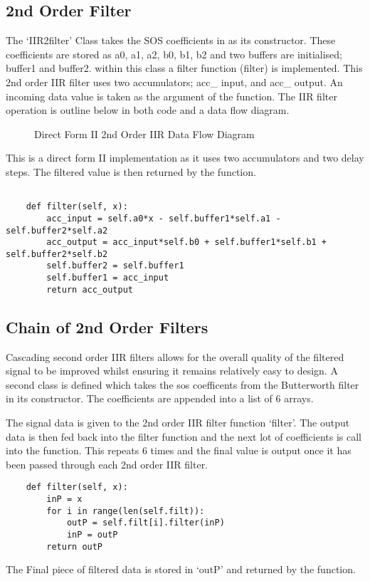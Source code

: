\documentclass{article}
\begin{document}
\subsection{2nd Order Filter}
The `IIR2filter' Class takes the SOS coefficients in as its constructor. These coefficients are stored as a0, a1, a2, b0, b1, b2 and two buffers are initialised; buffer1 and buffer2. within this class a filter function (filter) is implemented. This 2nd order IIR filter uses two accumulators; acc\_ input, and acc\_ output. An incoming data value is taken as the argument of the function. The IIR filter operation is outline below in both code and a data flow diagram.
\newline
\begin{figure}[h!]
    \centering
    
    \caption{Direct Form II 2nd Order IIR Data Flow Diagram }
    \label{fig:universe}
\end{figure}
\newline 
This is a direct form II implementation as it uses two accumulators and two delay steps. The filtered value is then returned by the function. 
\newline
\newline
\begin{lstlisting}

    def filter(self, x): 
        acc_input = self.a0*x - self.buffer1*self.a1 - self.buffer2*self.a2 
        acc_output = acc_input*self.b0 + self.buffer1*self.b1 + self.buffer2*self.b2 
        self.buffer2 = self.buffer1
        self.buffer1 = acc_input
        return acc_output
\end{lstlisting}

\subsection{Chain of 2nd Order Filters}

Cascading second order IIR filters allows for the overall quality of the filtered signal to be improved whilst ensuring it remains relatively easy to design. A second class is defined which takes the sos coefficents from the Butterworth filter in its constructor. The coefficients are appended into a list of 6 arrays. 

The signal data is given to the 2nd order IIR filter function `filter'. The output data is then fed back into the filter function and the next lot of coefficients is call into the function. This repeats 6 times and the final value is output once it has been passed through each 2nd order IIR filter. 
\newline
\begin{lstlisting}
    def filter(self, x): 
        inP = x
        for i in range(len(self.filt)):
            outP = self.filt[i].filter(inP)
            inP = outP
        return outP
\end{lstlisting}
\newline
\newline
The Final piece of filtered data is stored in `outP' and returned by the function. 
\end{document}
